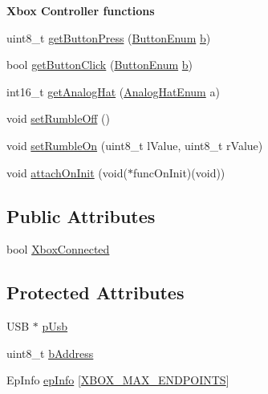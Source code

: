 \begin{Indent}{\bf \-Xbox \-Controller functions}\par
\begin{DoxyCompactItemize}
\item 
uint8\-\_\-t \hyperlink{class_x_b_o_x_o_l_d_a81c07adc969bcfbbb10a36b3544ee85a}{get\-Button\-Press} (\hyperlink{controller_enums_8h_a94f7389d205c78830a5441370d7870fd}{\-Button\-Enum} \hyperlink{_p_s4_parser_8h_a4313c9563516f94387762ab05763456b}{b})
\item 
bool \hyperlink{class_x_b_o_x_o_l_d_a61ed3d2e7d782b4456b3ed863a50789f}{get\-Button\-Click} (\hyperlink{controller_enums_8h_a94f7389d205c78830a5441370d7870fd}{\-Button\-Enum} \hyperlink{_p_s4_parser_8h_a4313c9563516f94387762ab05763456b}{b})
\item 
int16\-\_\-t \hyperlink{class_x_b_o_x_o_l_d_af1ed3d92780ba8771219c1ecf4f06485}{get\-Analog\-Hat} (\hyperlink{controller_enums_8h_a34dad8f0a0927471137c403216597093}{\-Analog\-Hat\-Enum} a)
\item 
void \hyperlink{class_x_b_o_x_o_l_d_a8014cc70e141362e09beeedb49428746}{set\-Rumble\-Off} ()
\item 
void \hyperlink{class_x_b_o_x_o_l_d_ab69673ea316c30268a5eedc893bea3a9}{set\-Rumble\-On} (uint8\-\_\-t l\-Value, uint8\-\_\-t r\-Value)
\item 
void \hyperlink{class_x_b_o_x_o_l_d_a7a7d0f28e51ef4650ac5e2b6c883b159}{attach\-On\-Init} (void($\ast$func\-On\-Init)(void))
\end{DoxyCompactItemize}
\end{Indent}
\subsection*{\-Public \-Attributes}
\begin{DoxyCompactItemize}
\item 
bool \hyperlink{class_x_b_o_x_o_l_d_aa091ff52ba7ad4216b0cd0f18651b755}{\-Xbox\-Connected}
\end{DoxyCompactItemize}
\subsection*{\-Protected \-Attributes}
\begin{DoxyCompactItemize}
\item 
\-U\-S\-B $\ast$ \hyperlink{class_x_b_o_x_o_l_d_a2b4d7d994ab6f5e1d1344d4162e9f5fb}{p\-Usb}
\item 
uint8\-\_\-t \hyperlink{class_x_b_o_x_o_l_d_ae28d3306b484750d7067fa5f7ed0beae}{b\-Address}
\item 
\-Ep\-Info \hyperlink{class_x_b_o_x_o_l_d_a06a318db8037f25a8d9bb62785dbacb9}{ep\-Info} \mbox{[}\hyperlink{_x_b_o_x_u_s_b_8h_af35f872fc33e690571eb99de648e8e96}{\-X\-B\-O\-X\-\_\-\-M\-A\-X\-\_\-\-E\-N\-D\-P\-O\-I\-N\-T\-S}\mbox{]}
\end{DoxyCompactItemize}


